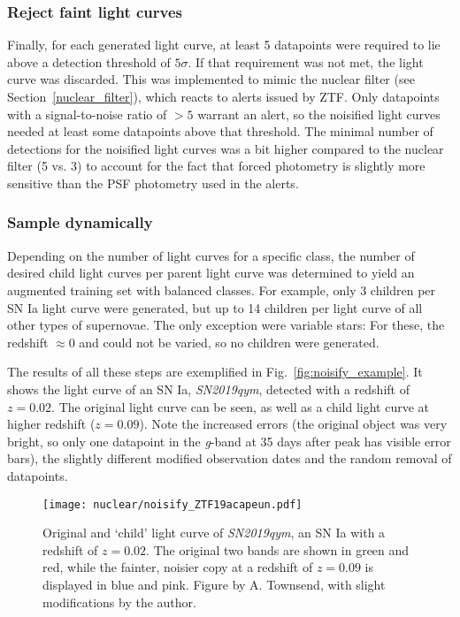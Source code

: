 \subsubsection{Reject faint light curves}
Finally, for each generated light curve, at least 5 datapoints were required to lie above a detection threshold of $5 \sigma$. If that requirement was not met, the light curve was discarded. This was implemented to mimic the nuclear filter (see Section~\ref{nuclear_filter}), which reacts to alerts issued by ZTF. Only datapoints with a signal-to-noise ratio of $>5$ warrant an alert, so the noisified light curves needed at least some datapoints above that threshold. The minimal number of detections for the noisified light curves was a bit higher compared to the nuclear filter (5 vs. 3) to account for the fact that forced photometry is slightly more sensitive than the PSF photometry used in the alerts.

\subsubsection{Sample dynamically}
Depending on the number of light curves for a specific class, the number of desired child light curves per parent light curve was determined to yield an augmented training set with balanced classes. For example, only 3 children per SN Ia light curve were generated, but up to 14 children per light curve of all other types of supernovae. The only exception were variable stars: For these, the redshift $\approx 0$ and could not be varied, so no children were generated.

The results of all these steps are exemplified in Fig.~\ref{fig:noisify_example}. It shows the light curve of an SN Ia, \textit{SN2019qym}, detected with a redshift of $z=0.02$. The original light curve can be seen, as well as a child light curve at higher redshift ($z=0.09$). Note the increased errors (the original object was very bright, so only one datapoint in the \textit{g}-band at 35 days after peak has visible error bars), the slightly different modified observation dates and the random removal of datapoints.

\begin{figure}[H]
  \texttt{[image: nuclear/noisify\_ZTF19acapeun.pdf]}
  \caption[Augmentation example]{Original and `child' light curve of \textit{SN2019qym}, an SN Ia with a redshift of $z=0.02$. The original two bands are shown in green and red, while the fainter, noisier copy at a redshift of $z=0.09$ is displayed in blue and pink. Figure by A. Townsend, with slight modifications by the author.}
\end{figure}

